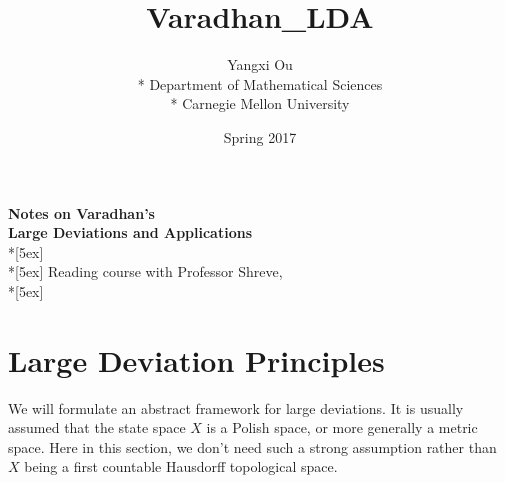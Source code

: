 \documentclass[openany,oneside]{article}
\title{Varadhan_LDA}
\author{Yangxi Ou \\* Department of Mathematical Sciences \\* Carnegie Mellon University}
\date{Spring 2017}
\theoremstyle{definition}
\theoremstyle{remark}
\begin{document}
\begin{center}	
	\textbf{\Large Notes on Varadhan's \\ Large Deviations and Applications} \\*[5ex]
	\theauthor \\*[5ex]
	Reading course with Professor Shreve, \thedate \\*[5ex]
	\tableofcontents
\end{center}


\setcounter{section}{1}

\section{Large Deviation Principles}
We will formulate an abstract framework for large deviations. It is usually assumed that the state space $X$ is a Polish space, or more generally a metric space. Here in this section, we don't need such a strong assumption rather than $X$ being a first countable Hausdorff topological space.
\end{document}
